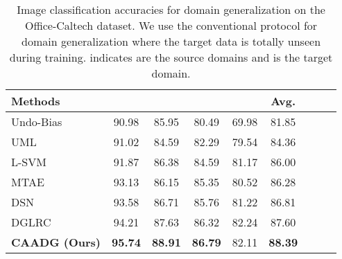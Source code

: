 \documentclass[review]{elsarticle}
\begin{document}
\begin{table*}[!htbp]
\fontsize{7}{8}\selectfont 
\begin{center}
\begin{tabular}{|l||c|c|c|c||c|c||c|c}
\hline

\textbf{Methods} & \textbf{} & \textbf{} & \textbf{} & \textbf{}&  \textbf{Avg.}\\
\hline\hline

Undo-Bias \cite{Khosla:2012:UDD:2402940.2402953}   &90.98 &85.95 &80.49 &69.98 &81.85 \\

UML \cite{6751316}   &91.02  &84.59  &82.29   &79.54  &84.36 \\

L-SVM \cite{DBLP:journals/jmlr/FanCHWL08}   &91.87  &86.38  &84.59   &81.17  &86.00 \\

MTAE \cite{DBLP:conf/iccv/GhifaryKZB15} &93.13  &86.15  &85.35   &80.52  & 86.28\\


DSN \cite{Bousmalis:2016:DSN:3157096.3157135} &93.58  &86.71  &85.76   &81.22  &86.81 \\

DGLRC \cite{8053784} &94.21  &87.63  &86.32   &82.24  &87.60 \\


\hline
\hline
\textbf{CAADG (Ours)}  &\textbf{95.74} &\textbf{88.91}  & \textbf{86.79}  &82.11 &\textbf{88.39}\\
\hline
\end{tabular}
\end{center}
\caption{Image classification accuracies for domain generalization on the Office-Caltech dataset. We use the conventional protocol for domain generalization where the target data is totally unseen during training.  indicates  are the source domains and  is the target domain.}
\label{Off_Cal_DG}
\end{table*}
\end{document}
